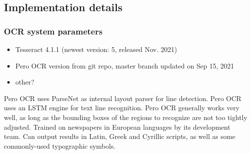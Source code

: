  




\subsection{Implementation details}

\subsubsection{OCR system parameters}
\begin{itemize}
    \item Tesseract 4.1.1 (newest version: 5, released Nov. 2021)
    \item Pero OCR version from git repo, master branch updated on Sep 15, 2021 %
    \item other?  %
\end{itemize}

Pero OCR uses ParseNet  as internal layout parser for line detection.
Pero OCR uses an LSTM engine  for text line recognition.
Pero OCR generally works very well, as long as the bounding boxes of the regions to recognize are not too tightly adjusted.
Trained on newspapers in European languages by its development team.
Can output results in Latin, Greek and Cyrillic scripts, as well as some commonly-used typographic symbols.




